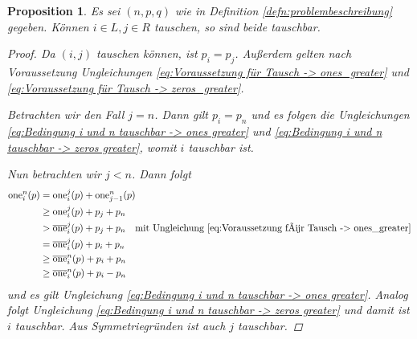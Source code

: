 \documentclass[12pt]{article}
\newtheorem{prop}[thm]{Proposition}
\begin{document}
\begin{prop}
Es sei $(n, p, q)$ wie in Definition \ref{defn:problembeschreibung} gegeben. Können $i\in L, j\in R$ tauschen, so sind beide tauschbar.
\begin{proof}
Da $(i, j)$ tauschen können, ist $p_i=p_j$. Außerdem gelten nach Voraussetzung Ungleichungen \ref{eq:Voraussetzung für Tausch -> ones_greater} und \ref{eq:Voraussetzung für Tausch -> zeros_greater}.

Betrachten wir den Fall $j=n$. Dann gilt $p_i=p_n$ und es folgen die Ungleichungen \ref{eq:Bedingung i und n tauschbar -> ones greater} und \ref{eq:Bedingung i und n tauschbar -> zeros greater}, womit $i$ tauschbar ist.

Nun betrachten wir  $j<n$. Dann folgt
\begin{align*}
\mathrm{one}_i^{n}(p)
&=
\mathrm{one}_i^{j}(p)
+
\mathrm{one}_{j-1}^{n}(p)
\\
&\geq 
\mathrm{one}_i^{j}(p)
+
p_j+p_n
\\
&>
\overline{\mathrm{one}}_i^{j}(p)
+
p_j+p_n
\quad\textrm{mit Ungleichung \ref{eq:Voraussetzung für Tausch -> ones_greater}}
\\
&=
\overline{\mathrm{one}}_i^{j}(p)
+
p_i+p_n
\\
&\geq
\overline{\mathrm{one}}_i^{n}(p)
+
p_i+p_n
\\
&\geq
\overline{\mathrm{one}}_i^{n}(p)
+
p_i-p_n
\end{align*}
und es gilt Ungleichung \ref{eq:Bedingung i und n tauschbar -> ones greater}. Analog folgt Ungleichung \ref{eq:Bedingung i und n tauschbar -> zeros greater} und damit ist $i$ tauschbar.
Aus Symmetriegründen ist auch $j$ tauschbar.
\end{proof} 
\label{prop:wenn i j tauschen können, sind sie tauschbar}
\end{prop}
\end{document}
